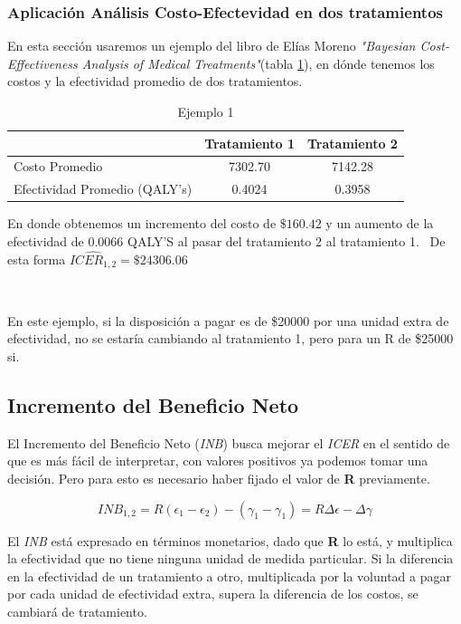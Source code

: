 \documentclass{article}
\begin{document}
\subsubsection{Aplicación Análisis Costo-Efectevidad en dos tratamientos}

En esta sección usaremos un ejemplo del libro de Elías Moreno \textit{"Bayesian Cost-Effectiveness Analysis of Medical Treatments"}(tabla \ref{tabla:1}), en dónde tenemos los costos y la efectividad promedio de dos tratamientos.

\begin{table}[ht]
\centering
\begin{tabular}{lcc}
  \hline
 & Tratamiento 1 & Tratamiento 2 \\ 
  \hline
Costo Promedio & 7302.70 & 7142.28 \\ 
  Efectividad Promedio (QALY's) & 0.4024 & 0.3958 \\ 
 \hline
\end{tabular}
\caption{Ejemplo 1}
\label{tabla:1}
\end{table}

En donde obtenemos un incremento del costo de $\$160.42$ y un aumento de la efectividad de 0.0066 QALY'S al pasar del tratamiento 2 al tratamiento 1.
\
De esta forma $\widehat{ICER_{1,2}} = \$24306.06$ 

\

En este ejemplo, si la disposición a pagar es de \$20000 por una unidad extra de efectividad, no se estaría cambiando al tratamiento 1, pero para un R de \$25000 si.

\subsection{Incremento del Beneficio Neto}

El Incremento del Beneficio Neto (\textit{INB}) busca mejorar el \textit{ICER} en el sentido de que es más fácil de interpretar, con valores positivos ya podemos tomar una decisión. Pero para esto es necesario haber fijado el valor de \textbf{R} previamente.

\begin{equation}
    INB_{1,2} = R(\epsilon_1-\epsilon_2)-(\gamma_1-\gamma_1) = R\Delta\epsilon-\Delta\gamma
\end{equation}

El \textit{INB}  está expresado en términos monetarios, dado que \textbf{R} lo está, y multiplica la efectividad que no tiene ninguna unidad de medida particular. Si la diferencia en la efectividad de un tratamiento a otro, multiplicada por la voluntad a pagar por cada unidad de efectividad extra, supera la diferencia de los costos, se cambiará de tratamiento.
\end{document}
